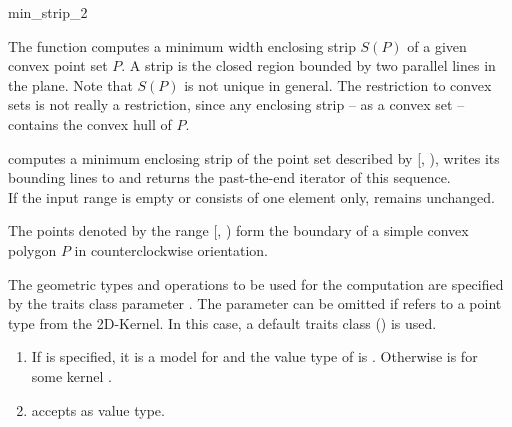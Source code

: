 \begin{ccRefFunction}{min_strip_2}
  
  \ccDefinition The function computes a minimum width enclosing strip
  $S(P)$ of a given convex point set $P$. A strip is the closed region
  bounded by two parallel lines in the plane. Note that $S(P)$ is not
  unique in general.  The restriction to convex sets is not really a
  restriction, since any enclosing strip -- as a convex set --
  contains the convex hull of $P$.


  \def\ccLongParamLayout{\ccTrue} 
  
  
  computes a minimum enclosing strip of the point set described by
  [, ), writes its bounding lines to
   and returns the past-the-end iterator of this sequence.\\
  If the input range is empty or consists of one element only, 
  remains unchanged.
  
  \ccPrecond The points denoted by the range [,
  ) form the boundary of a simple convex polygon $P$
  in counterclockwise orientation.

  The geometric types and operations to be used for the computation
  are specified by the traits class parameter . The parameter
  can be omitted if  refers to a point type from
  the 2D-Kernel. In this case, a default traits class
  () is used.
  
  \ccRequire
  \begin{enumerate}
  \item If  is specified, it is a model for
     and the value type  of
     is .  Otherwise 
    is  for some kernel .
  \item {} accepts  as value type.
  \end{enumerate}
  

\end{ccRefFunction}
